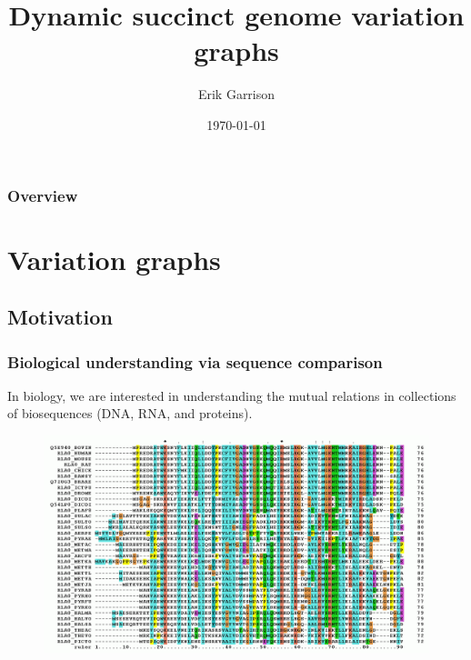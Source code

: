 \documentclass{beamer}
\title[\textsc{dsgvg} @ LAW\&LSD]{Dynamic succinct genome variation graphs} %
\author{Erik Garrison} %
\institute[UCSC] %
{
University of California, Santa Cruz \\ %
\medskip
\textit{erik.garrison@gmail.com} %
}
\date{\today} %
\begin{document}
\begin{frame}
\titlepage %
\end{frame}

\begin{frame}
\frametitle{Overview} %
\tableofcontents %
\end{frame}


\section{Variation graphs} %

\subsection{Motivation}

\begin{frame}
  \frametitle{Biological understanding via sequence comparison}
In biology, we are interested in understanding the mutual relations in collections of biosequences (DNA, RNA, and proteins).

\begin{figure}
  \includegraphics[scale=0.2,center]{RPLP0_90_ClustalW_aln.png}
\end{figure}


\end{frame}
\end{document}
